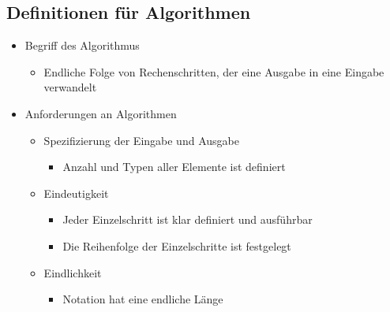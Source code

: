 \subsection{Definitionen für Algorithmen}
\begin{itemize}
    \item Begriff des Algorithmus
        \begin{itemize}
        	\item Endliche Folge von Rechenschritten, der eine Ausgabe in eine Eingabe verwandelt 
        \end{itemize}
        
    \item Anforderungen an Algorithmen
        \begin{itemize}
            \item Spezifizierung der Eingabe und Ausgabe 
              \begin{itemize}
                    \item Anzahl und Typen aller Elemente ist definiert
              \end{itemize}
          \item Eindeutigkeit
              \begin{itemize}
                    \item Jeder Einzelschritt ist klar definiert und ausführbar 
                    \item Die Reihenfolge der Einzelschritte ist festgelegt
              \end{itemize}
            \item Eindlichkeit
              \begin{itemize}
                    \item Notation hat eine endliche Länge
              \end{itemize}
        \end{itemize}


\end{itemize}
